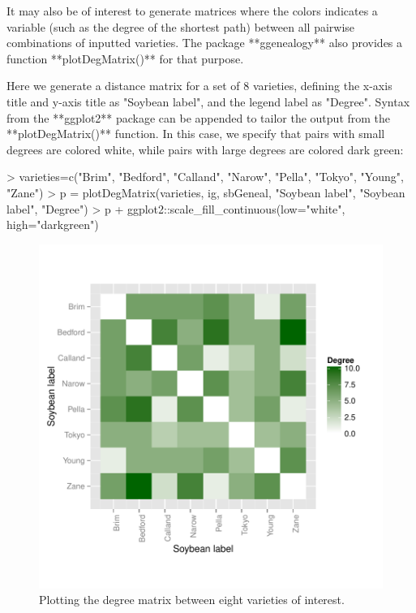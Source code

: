\documentclass{article}
\numberwithin{equation}{section} %
\begin{document}
It may also be of interest to generate matrices where the colors indicates a variable (such as the degree of the shortest path) between all pairwise combinations of inputted varieties. The package **ggenealogy** also provides a function **plotDegMatrix()** for that purpose.

Here we generate a distance matrix for a set of 8 varieties, defining the x-axis title and y-axis title as "Soybean label", and the legend label as "Degree". Syntax from the **ggplot2** package can be appended to tailor the output from the **plotDegMatrix()** function. In this case, we specify that pairs with small degrees are colored white, while pairs with large degrees are colored dark green:

\begin{Schunk}
\begin{Sinput}
> varieties=c("Brim", "Bedford", "Calland", "Narow", "Pella", "Tokyo", "Young", "Zane")
> p = plotDegMatrix(varieties, ig, sbGeneal, "Soybean label", "Soybean label", "Degree")
> p + ggplot2::scale_fill_continuous(low="white", high="darkgreen")
\end{Sinput}
\end{Schunk}

\begin{figure} 
  \begin{center} 
\includegraphics{ggenealogy-plotDegMatrix1}
\end{center} 
\caption{Plotting the degree matrix between eight varieties of interest.}
\label{fig:plotDegMatrix1}
\end{figure}
\end{document}
